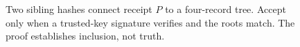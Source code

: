 \begin{figure}[H]
\centering
{}
\caption{Two sibling hashes connect receipt $P$ to a four-record tree.
Accept only when a trusted-key signature verifies and the roots match.
The proof establishes inclusion, not truth.}
\label{fig:bonded-inclusion-check}
\end{figure}
